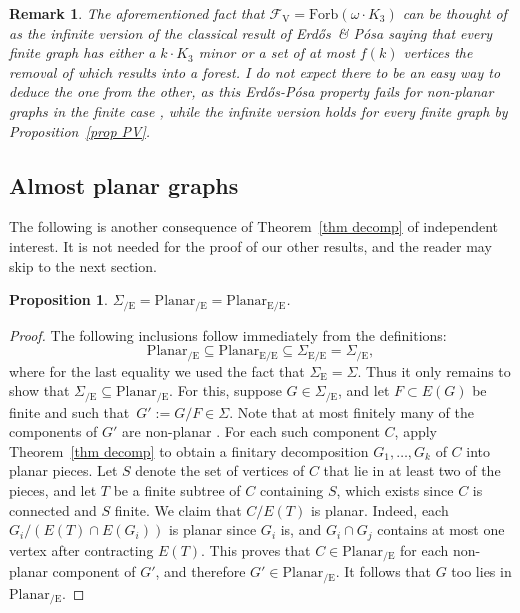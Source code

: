 \documentclass{article}
\newtheorem{remark}{Remark}
\newcommand{\forb}[1]{\mathrm{Forb}(#1)}
\newcommand{\pln}{\ensuremath{\mathrm{Planar}}}
\newcommand{\frs}{\mathcal{F}}
\newcommand{\frsV}{\frs_\mathrm{V}}
\newcommand{\rme}[1]{\ensuremath{#1_{\mathrm{E}}}}
\newcommand{\rmce}[1]{\ensuremath{#1_{\mathrm{/E}}}}
\newcommand{\rmece}[1]{\ensuremath{#1_{\mathrm{E/E}}}}
\newcommand{\Sig}{\ensuremath{\Sigma}}
\newcommand{\omdot}{\omega \cdot}
\newtheorem{proposition}{Proposition}[section]
\newcommand{\Tr}[1]{Theorem~\ref{#1}}
\newcommand{\Prr}[1]{Pro\-position~\ref{#1}}
\newcommand{\st}{such that}
\newcommand{\Erd}{Erd\H{o}s}
\begin{document}
\begin{remark}
\textup{The aforementioned fact that $\frsV= \forb{\omdot K_3}$ can be thought of as the infinite version of the classical result of \Erd\ \& P\'osa \cite{ErdPosInd} saying that every finite graph has either a $k\cdot K_3$ minor or a set of at most $f(k)$ vertices the removal of which results into a forest. I do not expect there to be an easy way to deduce the one from the other, as this \Erd-P\'osa property fails for non-planar graphs in the finite case \cite{GMV}, while the infinite version holds for every finite graph by \Prr{prop PV}}.
\end{remark}

\subsection{Almost planar graphs} \label{sec AP}

The following is another consequence of \Tr{thm decomp} of independent interest. It is not needed for the proof of our other results, and the reader may skip to the next section. 
\begin{proposition} \label{prop AP}
$\rmce{\Sig} = \rmce{\pln} =\rmece{\pln}$.
\end{proposition}
\begin{proof}
The following inclusions follow immediately from the definitions:
$$\rmce{\pln} \subseteq \rmece{\pln} \subseteq \rmece{\Sig} = \rmce{\Sig},$$
where for the last equality we used the fact that $\rme{\Sig} = {\Sig}$. Thus it only remains to show that $\rmce{\Sig} \subseteq \rmce{\pln}$. For this, suppose $G \in \rmce{\Sig}$, and let $F\subset E(G)$ be finite and \st\ $G':= G / F\in \Sig$. Note that at most finitely many of the components of $G'$ are non-planar \cite{MilAdd}. For each such component $C$, apply \Tr{thm decomp} to obtain a finitary decomposition $G_1,\ldots, G_k$ of $C$ into planar pieces. Let $S$ denote the set of vertices of $C$ that lie in at least two of the pieces, and let $T$ be a finite subtree of $C$ containing $S$, which exists since $C$ is connected and $S$ finite. We claim that $C / E(T)$ is planar. Indeed, each $G_i /(E(T) \cap E(G_i))$ is planar since $G_i$ is, and $G_i \cap G_j$ contains at most one vertex after contracting $E(T)$. This proves that $C\in \rmce{\pln}$ for each non-planar component of $G'$, and therefore $G'\in \rmce{\pln}$. It follows that $G$ too lies in $\rmce{\pln}$.
\end{proof}
\end{document}
